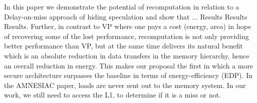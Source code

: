 In this paper we demonstrate the potential of recomputation in relation to a Delay-on-miss approach of hiding speculation and show that ... Results Results Results. Further, {\color{red} in contrast to VP where one pays a cost (energy, area) in hope of recovering some of the lost performance, recomputation is not only providing better performance than VP, but at the same time delivers its natural benefit which is an absolute reduction in data transfers in the memory hierarchy, hence an overall reduction in energy. This makes our proposal the first in which a more secure architecture surpasses the baseline in terms of energy-efficiency (EDP).
}{\color{blue} In the AMNESIAC paper, loads are never sent out to the memory system. In our work, we still need to access the L1, to determine if it is a miss or not.}




